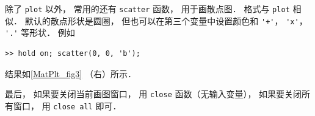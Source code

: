 除了 \lstinline|plot| 以外， 常用的还有 \lstinline|scatter| 函数， 用于画散点图． 格式与 \lstinline|plot| 相似． 默认的散点形状是圆圈， 但也可以在第三个变量中设置颜色和 \lstinline|'+'|， \lstinline|'x'|， \lstinline|'.'| 等形状． 例如
\begin{lstlisting}[language=matlabC]
>> hold on; scatter(0, 0, 'b');
\end{lstlisting}
结果如\autoref{MatPlt_fig3} （右）所示．

最后， 如果要关闭当前画图窗口， 用 \lstinline|close| 函数（无输入变量）， 如果要关闭所有窗口， 用 \lstinline|close all| 即可．

